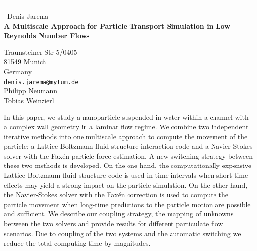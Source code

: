 \documentclass{report}
\begin{document}
\begin{center}
\rule{6in}{1pt} \
{\large Denis Jarema \\
{\bf A Multiscale Approach for Particle Transport Simulation in Low Reynolds Number Flows}}

Traunsteiner Str 5/0405 \\ 81549 Munich \\ Germany
\\
{\tt denis.jarema@mytum.de}\\
Philipp Neumann\\
Tobias Weinzierl\end{center}

In this paper, we study a nanoparticle suspended in water within a
channel with a complex wall geometry in a laminar flow regime. We combine
two independent iterative methods into one multiscale approach to compute
the movement of the particle: a Lattice Boltzmann fluid-structure
interaction code and a Navier-Stokes solver with the Fax\'{e}n particle
force estimation. A new switching strategy between these two methods is
developed. On the one hand, the computationally expensive Lattice
Boltzmann fluid-structure code is used in time intervals when short-time
effects may yield a strong impact on the particle simulation. On the
other hand, the Navier-Stokes solver with the Fax\'{e}n correction is
used to compute the particle movement when long-time predictions to the
particle motion are possible and sufficient. We describe our coupling
strategy, the mapping of unknowns between the two solvers and provide
results for different particulate flow scenarios. Due to coupling of the
two systems and the automatic switching we reduce the total computing
time by magnitudes.
\end{document}
